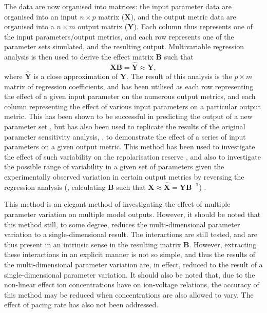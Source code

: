 \documentclass[../thesis-main.tex]{subfiles}
\begin{document}
 The data are now organised into matrices: the input parameter data are organised into an input $n\times p$ matrix ($\mathbf{X}$), and the output metric data are organised into a $n\times m$ output matrix ($\mathbf{Y}$). Each column thus represents one of the input parameters/output metrics, and each row represents one of the parameter sets simulated, and the resulting output. Multivariable regression analysis is then used to derive the effect matrix $\mathbf{B}$ such that
 \begin{equation}
  \mathbf{XB} = \mathbf{\hat{Y}} \approx \mathbf{Y},
 \end{equation}
 where $\mathbf{\hat{Y}}$ is a close approximation of $\mathbf{Y}$. The result of this analysis is the $p\times m$ matrix of regression coefficients, and has been utilised as each row representing the effect of a given input parameter on the numerous output metrics, and each column representing the effect of various input parameters on a particular output metric. This has been shown to be successful in predicting the output of a new parameter set \citep{Sobie2009}, but has also been used to replicate the results of the original parameter sensitivity analysis, \idest, to demonstrate the effect of a series of input parameters on a given output metric. This method has been used to investigate the effect of such variability on the repolarisation reserve \citep{Sarkar2011}, and also to investigate the possible range of variability in a given set of parameters given the experimentally observed variation in certain output metrics by reversing the regression analysis (\idest, calculating $\mathbf{B}$ such that $\mathbf{X} \approx \mathbf{\hat{X}} = \mathbf{YB^{-1}}$) \citep{Sarkar2010}.
 
 This method is an elegant method of investigating the effect of multiple parameter variation on multiple model outputs. However, it should be noted that this method still, to some degree, reduces the multi-dimensional parameter variation to a single-dimensional result. The interactions are still tested, and are thus present in an intrinsic sense in the resulting matrix $\mathbf{B}$. However, extracting these interactions in an explicit manner is not so simple, and thus the results of the multi-dimensional parameter variation are, in effect, reduced to the result of a single-dimensional parameter variation. It should also be noted that, due to the non-linear effect ion concentrations have on ion-voltage relations, the accuracy of this method may be reduced when concentrations are also allowed to vary. The effect of pacing rate has also not been addressed.
 
\end{document}
